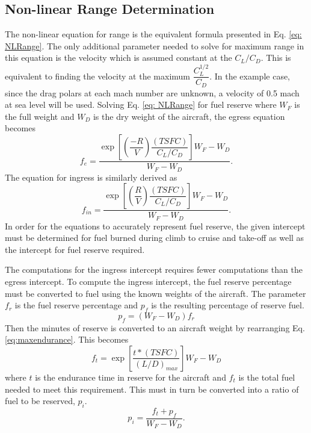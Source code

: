 \subsection*{Non-linear Range Determination}
The non-linear equation for range is the equivalent formula presented in Eq. \ref{eq: NLRange}. The only additional parameter needed to solve for maximum range in this equation is the velocity which is assumed constant at the $C_L/C_D$. This is equivalent to finding the velocity at the maximum $\dfrac{C_L^{1/2}}{C_D}$. In the example case, since the drag polars at each mach number are unknown, a velocity of 0.5 mach at sea level will be used. Solving Eq. \ref{eq: NLRange} for fuel reserve where $W_F$ is the full weight and $W_D$ is the dry weight of the aircraft, the egress equation becomes
\begin{equation}
    f_e = \dfrac{\exp\left[\left(\dfrac{-R}{V}\right)\dfrac{(TSFC)}{C_L/C_D}\right]W_F-W_D}{W_F - W_D}.
    \label{eq: NLEgressEq}
\end{equation}
The equation for ingress is similarly derived as 
\begin{equation}
    f_{in} =\dfrac{\exp\left[\left(\dfrac{R}{V}\right)\dfrac{(TSFC)}{C_L/C_D}\right]W_F-W_D}{W_F - W_D}.
    \label{eq: NLIngressEq}
\end{equation}
In order for the equations to accurately represent fuel reserve, the given intercept must be determined for fuel burned during climb to cruise and take-off as well as the intercept for fuel reserve required.\par
The computations for the ingress intercept requires fewer computations than the egress intercept. To compute the ingress intercept, the fuel reserve percentage must be converted to fuel using the known weights of the aircraft. The parameter $f_r$ is the fuel reserve percentage and $p_f$ is the resulting percentage of reserve fuel.
\begin{equation*}
    p_f = (W_F - W_D)f_r
\end{equation*}
Then the minutes of reserve is converted to an aircraft weight by rearranging Eq. \ref{eq:maxendurance}. This becomes
\begin{equation*}
    f_t = \exp\left[\dfrac{t*(TSFC)}{(L/D)_{max}}\right]W_F-W_D
\end{equation*}
where $t$ is the endurance time in reserve for the aircraft and $f_t$ is the total fuel needed to meet this requirement. This must in turn be converted into a ratio of fuel to be reserved, $p_i$.
\begin{equation*}
    p_i = \dfrac{f_t + p_f}{W_F-W_D}.
\end{equation*}
